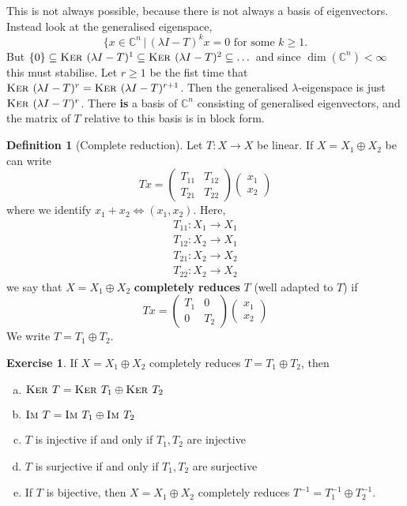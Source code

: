 \documentclass[10pt, oneside, reqno]{amsart}
\theoremstyle{plain}%
\theoremstyle{definition}
\newtheorem{defn}[thm]{Definition}
\newtheorem{exer}[thm]{Exercise}
\theoremstyle{remark}
\newcommand{\given}{ \, | \,}
\newcommand{\Com}{\mathbb{C}}
\newcommand{\im}{\textsc{Im\ }}
\renewcommand{\ker}{\textsc{Ker\ }}
\begin{document}
This is not always possible, because there is not always a basis of eigenvectors.  Instead look at the generalised eigenspace, \[
    \{ x \in \Com^n \given \text{$(\lambda I - T)^k x = 0$ for some $k \geq 1$}.  
\] 
But $\{ 0 \} \subseteq \ker(\lambda I - T)^1 \subseteq \ker(\lambda I - T)^2 \subseteq \dots$
 and since $\dim(\Com^n) < \infty$ this must stabilise.  Let $r \geq 1$ be the fist time that $\ker (\lambda I - T)^r = \ker( \lambda I - T)^{r+1}$.  Then the generalised $\lambda$-eigenspace is just $\ker(\lambda I - T)^r$.  There \textbf{is} a basis of $\Com^n$ consisting of generalised eigenvectors, and the matrix of $T$ relative to this basis is in block form.  

\begin{defn}[Complete reduction]
    Let $T: X \rightarrow X$ be linear.  If $X = X_1 \oplus X_2$ be can write \[
        Tx = \begin{pmatrix}
            T_{11} & T_{12} \\
            T_{21} & T_{22}
        \end{pmatrix} \begin{pmatrix}
            x_1 \\
            x_2
        \end{pmatrix}
    \] where we identify $x_1 + x_2 \iff (x_1, x_2)$.  Here, \begin{align*}
        T_{11}: X_1 \rightarrow X_1 \\
        T_{12}: X_2 \rightarrow X_1 \\
        T_{21} : X_2 \rightarrow X_2 \\
        T_{22} : X_2 \rightarrow X_2
    \end{align*} we say that $X = X_1 \oplus X_2$ \textbf{completely reduces} $T$ (well adapted to $T$) if \[
        Tx = \begin{pmatrix}
            T_1 & 0 \\
            0   & T_2 
        \end{pmatrix} \begin{pmatrix}
            x_1 \\
            x_2
        \end{pmatrix}
    \]  We write $T = T_1 \oplus T_2$.
\end{defn}

\begin{exer}
    If $X = X_1 \oplus X_2$ completely reduces $T = T_1 \oplus T_2$, then \begin{enumerate}[(a)]
        \item $\ker T = \ker T_1 \oplus \ker T_2$ 
        \item $\im T = \im T_1 \oplus \im T_2$
        \item $T$ is injective if and only if $T_1, T_2$ are injective
        \item $T$ is surjective if and only if $T_1, T_2$ are surjective
        \item If $T$ is bijective, then $X = X_1 \oplus X_2$ completely reduces $T^{-1} = T_1^{-1} \oplus T^{-1}_2$.
    \end{enumerate}
\end{exer}
\end{document}
